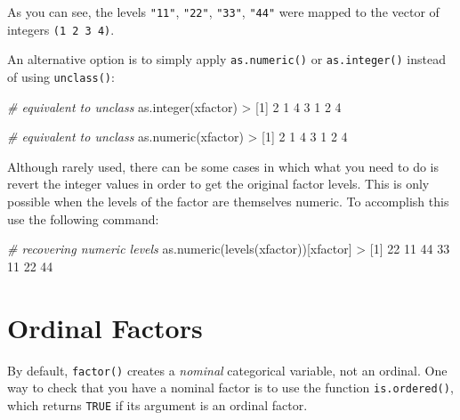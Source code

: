 \documentclass[
]{book}
\newenvironment{Shaded}{\begin{snugshade}}{\end{snugshade}}
\newcommand{\CommentTok}[1]{\textcolor[rgb]{0.56,0.35,0.01}{\textit{#1}}}
\newcommand{\DecValTok}[1]{\textcolor[rgb]{0.00,0.00,0.81}{#1}}
\newcommand{\FunctionTok}[1]{\textcolor[rgb]{0.00,0.00,0.00}{#1}}
\newcommand{\NormalTok}[1]{#1}
\newcommand{\SpecialCharTok}[1]{\textcolor[rgb]{0.00,0.00,0.00}{#1}}
\begin{document}
As you can see, the levels \texttt{"11"}, \texttt{"22"}, \texttt{"33"}, \texttt{"44"} were mapped to the
vector of integers \texttt{(1\ 2\ 3\ 4)}.

An alternative option is to simply apply \texttt{as.numeric()} or \texttt{as.integer()}
instead of using \texttt{unclass()}:

\begin{Shaded}
\begin{Highlighting}[]
\CommentTok{\# equivalent to unclass}
\FunctionTok{as.integer}\NormalTok{(xfactor)}
\SpecialCharTok{\textgreater{}}\NormalTok{ [}\DecValTok{1}\NormalTok{] }\DecValTok{2} \DecValTok{1} \DecValTok{4} \DecValTok{3} \DecValTok{1} \DecValTok{2} \DecValTok{4}

\CommentTok{\# equivalent to unclass}
\FunctionTok{as.numeric}\NormalTok{(xfactor)}
\SpecialCharTok{\textgreater{}}\NormalTok{ [}\DecValTok{1}\NormalTok{] }\DecValTok{2} \DecValTok{1} \DecValTok{4} \DecValTok{3} \DecValTok{1} \DecValTok{2} \DecValTok{4}
\end{Highlighting}
\end{Shaded}

Although rarely used, there can be some cases in which what you need to do is
revert the integer values in order to get the original factor levels. This is
only possible when the levels of the factor are themselves numeric. To accomplish
this use the following command:

\begin{Shaded}
\begin{Highlighting}[]
\CommentTok{\# recovering numeric levels}
\FunctionTok{as.numeric}\NormalTok{(}\FunctionTok{levels}\NormalTok{(xfactor))[xfactor]}
\SpecialCharTok{\textgreater{}}\NormalTok{ [}\DecValTok{1}\NormalTok{] }\DecValTok{22} \DecValTok{11} \DecValTok{44} \DecValTok{33} \DecValTok{11} \DecValTok{22} \DecValTok{44}
\end{Highlighting}
\end{Shaded}

\hypertarget{ordinal-factors}{%
\section{Ordinal Factors}\label{ordinal-factors}}

By default, \texttt{factor()} creates a \emph{nominal} categorical variable, not an ordinal.
One way to check that you have a nominal factor is to use the function
\texttt{is.ordered()}, which returns \texttt{TRUE} if its argument is an ordinal factor.
\end{document}
